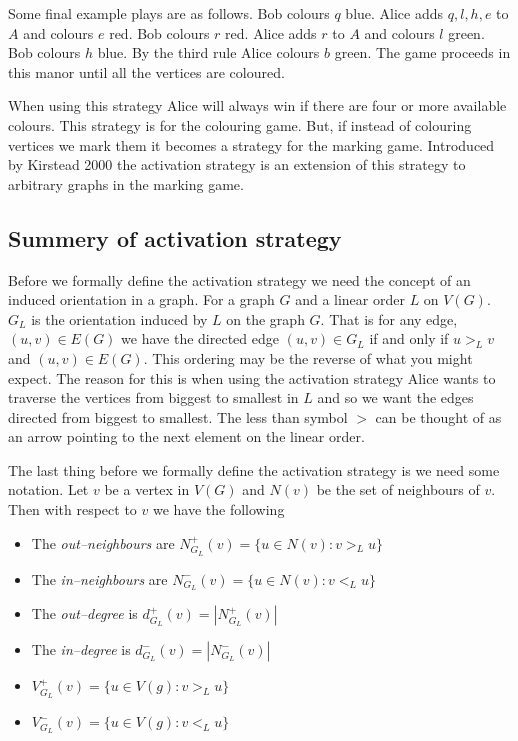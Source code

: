 %
Some final example plays are as follows. Bob colours $q$ blue. Alice adds $q,l,h,e$ to $A$ and colours $e$ red. Bob colours $r$ red. Alice adds $r$ to $A$ and colours $l$ green. Bob colours $h$ blue. By the third rule Alice colours $b$ green. The game proceeds in this manor until all the vertices are coloured. 

When using this strategy Alice will always win if there are four or more available colours. This strategy is for the colouring game. But, if instead of colouring vertices we mark them it becomes a strategy for the marking game. Introduced by Kirstead 2000 \cite{KIERSTEAD2000} the activation strategy is an extension of this strategy to arbitrary graphs in the marking game. 
 
\subsection{Summery of activation strategy}
%
Before we formally define the activation strategy we need the concept of an induced orientation in a graph. For a graph $G$ and a linear order $L$ on $V(G)$. $G_L$ is the orientation induced by $L$ on the graph $G$. That is for any edge, $(u,v)\in E(G)$ we have the directed edge $(u,v)\in G_L$ if and only if $u>_Lv$ and $(u,v)\in E(G)$. This ordering may be the reverse of what you might expect. The reason for this is when using the activation strategy Alice wants to traverse the vertices from biggest to smallest in $L$ and so we want the edges directed from biggest to smallest. The less than symbol $>$ can be thought of as an arrow pointing to the next element on the linear order.

The last thing before we formally define the activation strategy is we need some notation. Let $v$ be a vertex in $V(G)$ and $N(v)$ be the set of neighbours of $v$. Then with respect to $v$ we have the following
\begin{itemize}        
    \item The \textit{out--neighbours} are $N^+_{G_L}(v)=\{u\in N(v):v>_L u\}$ 
    \item The \textit{in--neighbours} are $N^-_{G_L}(v)=\{u\in N(v):v<_L u\}$ 
    \item The \textit{out--degree} is $d^+_{G_L}(v)=|N^+_{G_L}(v)|$ 
    \item The \textit{in--degree} is $d^-_{G_L}(v)=|N^-_{G_L}(v)|$
    \item $V^+_{G_L}(v)=\{u\in V(g):v>_L u\}$     
    \item $V^-_{G_L}(v)=\{u\in V(g):v<_L u\}$ 
\end{itemize}

